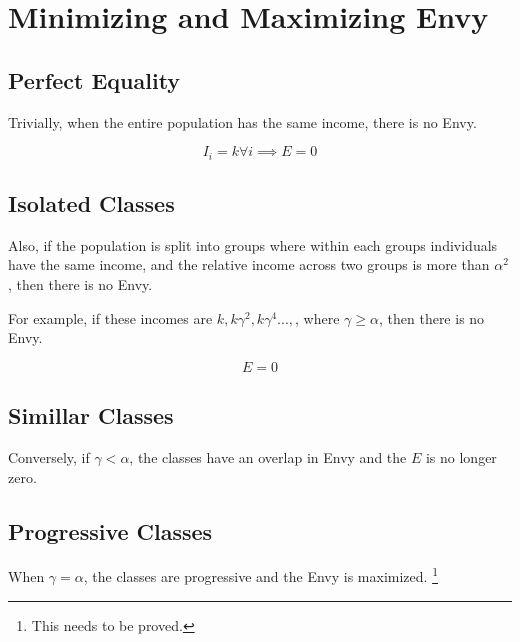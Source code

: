 \section {Minimizing and Maximizing Envy}

\subsection {Perfect Equality}

Trivially, when the entire population has the same income, there is no Envy. 

\begin{equation}
    I_i = k \forall i \implies E = 0
\end{equation}


\subsection {Isolated Classes}

Also, if the population is split into groups where within each groups individuals have the same income, and the relative income across two groups is more than $\alpha^2$, then there is no Envy.

For example, if these incomes are $k, k\gamma^2, k\gamma^4...,$, where $\gamma \ge \alpha$, then there is no Envy.

\begin{equation}
    E = 0
\end{equation}

\subsection {Simillar Classes}

Conversely, if $\gamma < \alpha$, the classes have an overlap in Envy and the ${E}$ is no longer zero.

\subsection {Progressive Classes}

When $\gamma = \alpha$, the classes are progressive and the Envy is maximized. \footnote{This needs to be proved.}
